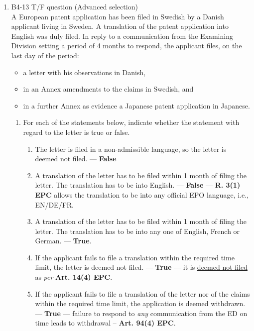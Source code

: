 \documentclass{report}
\begin{document}
\begin{enumerate}[label=\textbf{Answer \arabic*}]
\begin{enumerate}[label=\textbf{Answer \arabic*}]
    \item %
    B4-13 \quad T/F question (Advanced selection) \\
    A European patent application has been filed in Swedish by a Danish applicant living in Sweden. A translation of the patent application into English was duly filed. In reply to a communication from the Examining Division setting a period of 4 months to respond, the applicant files, on the last day of the period:
    \begin{itemize}
        \item a letter with his observations in Danish,
        \item in an Annex amendments to the claims in Swedish, and 
        \item in a further Annex as evidence a Japanese patent application in Japanese.
    \end{itemize}
    
    \begin{enumerate}[label=(\alph*)]
        \item For each of the statements below, indicate whether the statement with regard to the letter is true or false.
        \begin{enumerate}[label={(\alph{enumi}.\arabic*)}]
            \item The letter is filed in a non-admissible language, so the letter is deemed not filed. --- \textbf{False}
            \item A translation of the letter has to be filed within 1 month of filing the letter. The translation has to be into English. --- \textbf{False} --- \textbf{R. 3(1) EPC} allows the translation to be into any official EPO language, i.e., \textsc{EN/DE/FR}. 
            \item A translation of the letter has to be filed within 1 month of filing the letter. The translation has to be into any one of English, French or German. --- \textbf{True}.
            \item If the applicant fails to file a translation within the required time limit, the letter is deemed not filed. --- \textbf{True} --- it is \underline{deemed not filed} as \textit{per} \textbf{Art. 14(4) EPC}.
            \item If the applicant fails to file a translation of the letter nor of the claims within the required time limit, the application is deemed withdrawn. --- \textbf{True} --- failure to respond to \textit{any} communication from the ED on time leads to withdrawal -- \textbf{Art. 94(4) EPC}. 
        \end{enumerate}
        

\end{enumerate}
\end{enumerate}
\end{enumerate}
\end{document}
